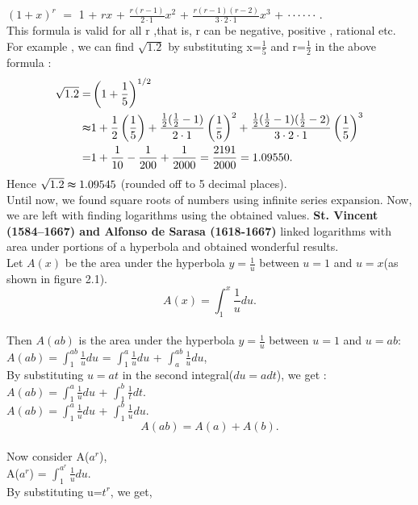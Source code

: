 \documentclass[a4paper,11pt]{article}
\begin{document}
$(1+x)^r$ $=$ 1 + $rx$ +   $\frac{r(r-1)}{2\cdot1}$$x^2$ +  $\frac{r(r-1)(r-2)}{3\cdot2\cdot1}$$x^3$ + $\cdots\cdots.\\$
\\

\noindent This formula is valid for all r ,that is, r can be negative, positive , rational etc.
For example , we can find $\sqrt{1.2}$ by substituting x=$\frac{1}{5}$ and r=$\frac{1}{2}$ in the above formula :\\
\begin{align*}
\sqrt{1.2}=& \left(1 + \frac{1}{5}\right)^{1/2} \\
\indent \thickapprox& 1 +  \frac{1}{2}\left(\frac{1}{5}\right)  +  \frac{ \frac{1}{2}(\frac{1}{2}-1)}{2\cdot1}\left(\frac{1}{5}\right)^2  + \frac{ \frac{1}{2}(\frac{1}{2}-1)(\frac{1}{2}-2)}{3\cdot2\cdot1}\left(\frac{1}{5}\right)^3 \\
\indent =& 1 +  \frac{1}{10}  -  \frac{1}{200} + \frac{1}{2000} = \frac{2191}{2000} = 1.09550.\\
\end{align*}
Hence $\sqrt{1.2} \thickapprox 1.09545$ (rounded off to 5 decimal places).\\
Until now, we found square roots of numbers using infinite series expansion.
Now, we are left with finding logarithms using the obtained values.
\textbf{St. Vincent (1584--1667) and Alfonso de Sarasa (1618-1667)} linked logarithms with area under portions of a hyperbola and obtained wonderful results.\\
Let $A(x)$ be the area under the hyperbola $y =\frac{1}{u}$  between $u = 1 $ and $u = x$(as shown in figure 2.1).
$$A(x) = \int_{1}^{x}\frac{1}{u}du .$$ \\
Then $A(ab)$ is the area under the hyperbola $y=\frac{1}{u}$ between $u=1$ and $u=ab$:\\
$A(ab) = \int_{1}^{ab}\frac{1}{u}du $ = $\int_{1}^{a}\frac{1}{u}du$ + 
$\int_{a}^{ab}\frac{1}{u}du$,\\
By substituting $u=at$ in the second integral($du=adt$), we get :\\
$A(ab)= \int_{1}^{a}\frac{1}{u}du$ + $\int_{1}^{b}\frac{1}{t}dt$.\\
\noindent $A(ab)= \int_{1}^{a}\frac{1}{u}du$ + $\int_{1}^{b}\frac{1}{u}du$.\\
$$\textbf{$A(ab)=A(a)+A(b).$}$$\\
Now consider A($a^r$),\\
A($a^r$) = $\int_{1}^{a^r}\frac{1}{u}du$.\\
By substituting u=$t^r$, we get,\\
\end{document}
